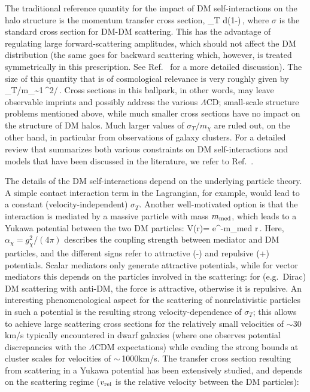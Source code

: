 The traditional reference quantity for  the impact of DM self-interactions on the halo 
structure is the momentum transfer cross section,
\be
\label{eq:sigmat}
 \sigma_T \equiv \int d\Omega\left(1-\cos\theta\right)\,,
\ee
where $\sigma$ is the standard cross section for DM-DM scattering. 
This has the advantage of regulating large forward-scattering amplitudes, which should
not affect the DM distribution (the same goes for backward scattering which, however,
is treated symmetrically in this prescription. See Ref.~\cite{Tulin:2013teo,Kahlhoefer:2017umn} 
for a more detailed discussion).
The size of this quantity that is of cosmological relevance is very roughly given by
\be
  \sigma_T/m_\chi \sim 1\,^2/\,.
\ee
Cross sections in this ballpark, in other words, may leave observable imprints and possibly address 
the various $\Lambda$CD; small-scale structure problems mentioned above, while much smaller cross 
sections have no impact on the structure of DM halos. Much larger values of $\sigma_T/m_\chi$ are 
ruled out, on the other hand, in particular from observations of galaxy clusters. For a detailed 
review that summarizes both various constraints on DM self-interactions and
models that have been discussed in the literature, we refer to Ref.~\cite{Tulin:2017ara}.

The details of the DM self-interactions depend on the underlying particle theory. A simple contact 
interaction term in the Lagrangian, for example, would lead to a constant (velocity-independent)
$\sigma_T$. Another well-motivated option is that the interaction is mediated by a massive particle
with mass $m_{\rm med}$, which leads to a Yukawa potential between the two DM particles:
\be
V(r)=\pm{} e^{-m_{\rm med} r}\,.
\ee
Here, $\alpha_\chi=g_\chi^2/(4\pi)$ describes the coupling strength between mediator and DM particles,
and the different signs refer to attractive (-) and repulsive (+) potentials. Scalar mediators only generate
attractive potentials, while for vector mediators this depends on the particles involved in the scattering: 
for (e.g.~Dirac) DM scattering with anti-DM, the force is attractive, otherwise it is repulsive. An interesting 
phenomenological aspect for the scattering of nonrelativistic particles in such a potential is the resulting 
strong velocity-dependence 
of $\sigma_T$; this allows to achieve large scattering cross sections for the relatively small velocities 
of $\sim$30\,km/s typically encountered
in dwarf galaxies (where one observes potential discrepancies with the $\Lambda$CDM expectations)
while evading the strong bounds at cluster scales for velocities of $\sim$\,1000km/s.
The transfer cross section resulting from scattering in a Yukawa potential has been extensively 
studied, and depends on the scattering regime ($v_{\rm rel}$ is the relative velocity between the
DM particles):

